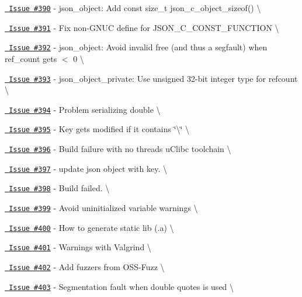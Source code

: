 \begin{DoxyItemize}
\item \href{https://github.com/json-c/json-c/issues/390}{\texttt{ Issue \#390}} -\/ json\+\_\+object\+: Add const size\+\_\+t json\+\_\+c\+\_\+object\+\_\+sizeof() \textbackslash{}
\item \href{https://github.com/json-c/json-c/issues/391}{\texttt{ Issue \#391}} -\/ Fix non-\/\+GNUC define for JSON\+\_\+\+C\+\_\+\+CONST\+\_\+\+FUNCTION \textbackslash{}
\item \href{https://github.com/json-c/json-c/issues/392}{\texttt{ Issue \#392}} -\/ json\+\_\+object\+: Avoid invalid free (and thus a segfault) when ref\+\_\+count gets $<$ 0 \textbackslash{}
\item \href{https://github.com/json-c/json-c/issues/393}{\texttt{ Issue \#393}} -\/ json\+\_\+object\+\_\+private\+: Use unsigned 32-\/bit integer type for refcount \textbackslash{}
\item \href{https://github.com/json-c/json-c/issues/394}{\texttt{ Issue \#394}} -\/ Problem serializing double \textbackslash{}
\item \href{https://github.com/json-c/json-c/issues/395}{\texttt{ Issue \#395}} -\/ Key gets modified if it contains \char`\"{}\textbackslash{}\char`\"{} \textbackslash{}
\item \href{https://github.com/json-c/json-c/issues/396}{\texttt{ Issue \#396}} -\/ Build failure with no threads u\+Clibc toolchain \textbackslash{}
\item \href{https://github.com/json-c/json-c/issues/397}{\texttt{ Issue \#397}} -\/ update json object with key. \textbackslash{}
\item \href{https://github.com/json-c/json-c/issues/398}{\texttt{ Issue \#398}} -\/ Build failed. \textbackslash{}
\item \href{https://github.com/json-c/json-c/issues/399}{\texttt{ Issue \#399}} -\/ Avoid uninitialized variable warnings \textbackslash{}
\item \href{https://github.com/json-c/json-c/issues/400}{\texttt{ Issue \#400}} -\/ How to generate static lib (.a) \textbackslash{}
\item \href{https://github.com/json-c/json-c/issues/401}{\texttt{ Issue \#401}} -\/ Warnings with Valgrind \textbackslash{}
\item \href{https://github.com/json-c/json-c/issues/402}{\texttt{ Issue \#402}} -\/ Add fuzzers from OSS-\/\+Fuzz \textbackslash{}
\item \href{https://github.com/json-c/json-c/issues/403}{\texttt{ Issue \#403}} -\/ Segmentation fault when double quotes is used \textbackslash{}

\end{DoxyItemize}
